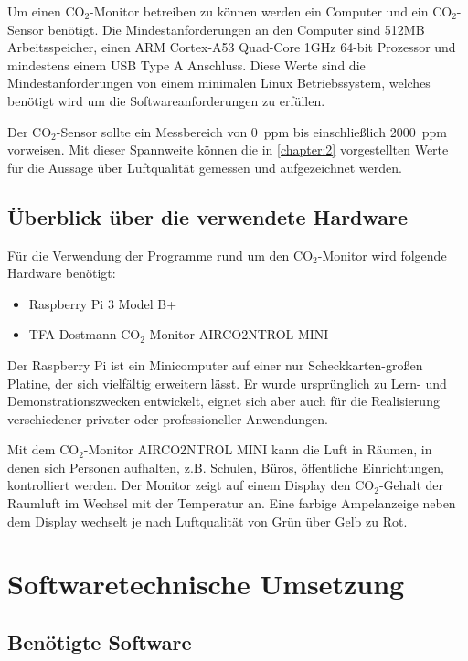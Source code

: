 \documentclass[a4paper,
    11pt,
    headings=small,
    ngerman,
    listof=totoc,
    numbers=noenddot]{scrreprt}[2021/11/13]
\begin{document}
Um einen CO$_2$-Monitor betreiben zu können werden ein Computer und ein CO$_2$-Sensor benötigt. Die Mindestanforderungen an den Computer sind 512MB Arbeitsspeicher, einen ARM Cortex-A53 Quad-Core 1GHz 64-bit Prozessor und mindestens einem USB Type A Anschluss. Diese Werte sind die Mindestanforderungen von einem minimalen Linux Betriebssystem, welches benötigt wird um die Softwareanforderungen zu erfüllen.

Der CO$_2$-Sensor sollte ein Messbereich von \SI{0}{ppm} bis einschließlich \SI{2000}{ppm} vorweisen. Mit dieser Spannweite können die in \vref{chapter:2} vorgestellten Werte für die Aussage über Luftqualität gemessen und aufgezeichnet werden.


\section{Überblick über die verwendete Hardware}

Für die Verwendung der Programme rund um den CO$_2$-Monitor wird folgende Hardware benötigt:

\begin{itemize}
  \item Raspberry Pi 3 Model B+
  \item TFA-Dostmann CO$_2$-Monitor AIRCO2NTROL MINI
\end{itemize}

Der Raspberry Pi ist ein Minicomputer auf einer nur Scheckkarten-großen Platine, der sich vielfältig erweitern lässt.
Er wurde ursprünglich zu Lern- und Demonstrationszwecken entwickelt, eignet sich aber auch für die
Realisierung verschiedener privater oder professioneller Anwendungen.

Mit dem CO$_2$-Monitor AIRCO2NTROL MINI kann die Luft in Räumen,
in denen sich Personen aufhalten, z.B. Schulen, Büros, öffentliche Einrichtungen, kontrolliert werden. Der Monitor zeigt auf einem Display den CO$_2$-Gehalt der Raumluft im Wechsel mit der Temperatur an. Eine farbige Ampelanzeige neben dem Display wechselt je nach Luftqualität von Grün über Gelb zu Rot.



\chapter{Softwaretechnische Umsetzung}


\section{Benötigte Software}
\end{document}
